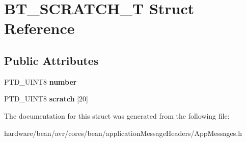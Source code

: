 \hypertarget{struct_b_t___s_c_r_a_t_c_h___t}{}\section{B\+T\+\_\+\+S\+C\+R\+A\+T\+C\+H\+\_\+\+T Struct Reference}
\label{struct_b_t___s_c_r_a_t_c_h___t}
\subsection*{Public Attributes}
\begin{DoxyCompactItemize}
\item 
\hypertarget{struct_b_t___s_c_r_a_t_c_h___t_afa931e12cf31f7ba824213e012492c36}{}P\+T\+D\+\_\+\+U\+I\+N\+T8 {\bfseries number}\label{struct_b_t___s_c_r_a_t_c_h___t_afa931e12cf31f7ba824213e012492c36}

\item 
\hypertarget{struct_b_t___s_c_r_a_t_c_h___t_a7a33ff73c781026808bc6bd7d27fa45d}{}P\+T\+D\+\_\+\+U\+I\+N\+T8 {\bfseries scratch} \mbox{[}20\mbox{]}\label{struct_b_t___s_c_r_a_t_c_h___t_a7a33ff73c781026808bc6bd7d27fa45d}

\end{DoxyCompactItemize}


The documentation for this struct was generated from the following file\+:\begin{DoxyCompactItemize}
\item 
hardware/bean/avr/cores/bean/application\+Message\+Headers/App\+Messages.\+h\end{DoxyCompactItemize}
